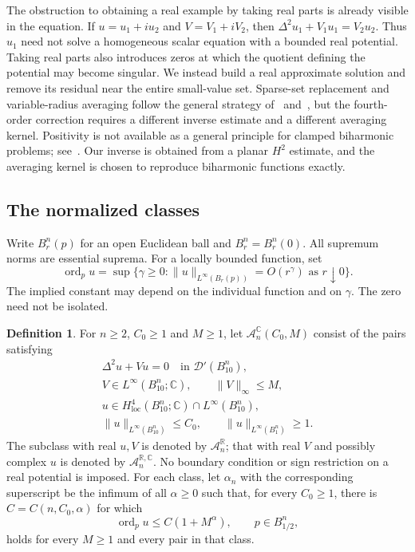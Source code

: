 \documentclass[11pt,twoside,leqno]{article}
\numberwithin{equation}{section}
\theoremstyle{definition}
\newtheorem{definition}[theorem]{Definition}
\theoremstyle{remark}
\newcommand{\R}{\mathbb R}
\newcommand{\C}{\mathbb C}
\newcommand{\ord}{\operatorname{ord}}
\newcommand{\loc}{\mathrm{loc}}
\begin{document}
The obstruction to obtaining a real example by taking real parts is
already visible in the equation. If $u=u_1+iu_2$ and $V=V_1+iV_2$,
then $\Delta^2u_1+V_1u_1=V_2u_2$. Thus $u_1$ need not solve a
homogeneous scalar equation with a bounded real potential. Taking real
parts also introduces zeros at which the quotient defining the potential
may become singular. We instead build a real approximate solution and
remove its residual near the entire small-value set. Sparse-set
replacement and variable-radius averaging follow the general strategy
of~\cite[Sections~6--9]{FI} and~\cite[Section~4]{FGJL}, but the
fourth-order correction requires a different inverse estimate and a
different averaging kernel. Positivity is not available as a general
principle for clamped biharmonic problems; see~\cite{GGS}. Our inverse
is obtained from a planar $H^2$ estimate, and the averaging kernel is
chosen to reproduce biharmonic functions exactly.

\subsection{The normalized classes}

Write $B_r^n(p)$ for an open Euclidean ball and $B_r^n=B_r^n(0)$.
All supremum norms are essential suprema. For a locally bounded function,
set
\begin{equation}\label{eq:order}
 \ord_pu=\sup\{\gamma\ge0:
 \|u\|_{L^\infty(B_r(p))}=O(r^\gamma)\text{ as }r\downarrow0\}.
\end{equation}
The implied constant may depend on the individual function and on
$\gamma$. The zero need not be isolated.

\begin{definition}\label{def:classes}
For $n\ge2$, $C_0\ge1$ and $M\ge1$, let
$\mathcal A_n^{\C}(C_0,M)$ consist of the pairs satisfying
\begin{equation}\label{eq:class}
 \begin{gathered}
 \Delta^2u+Vu=0\quad\text{in }\mathcal D'(B_{10}^n),\\
 V\in L^\infty(B_{10}^n;\C),\qquad \|V\|_\infty\le M,\\
 u\in H^4_{\loc}(B_{10}^n;\C)\cap L^\infty(B_{10}^n),\\
 \|u\|_{L^\infty(B_{10}^n)}\le C_0,\qquad
 \|u\|_{L^\infty(B_1^n)}\ge1.
 \end{gathered}
\end{equation}
The subclass with real $u,V$ is denoted by $\mathcal A_n^{\R}$;
that with real $V$ and possibly complex $u$ is denoted by
$\mathcal A_n^{\R,\C}$. No boundary condition or sign restriction
on a real potential is imposed.
For each class, let $\alpha_n$ with the corresponding superscript
be the infimum of all $\alpha\ge0$ such that, for every $C_0\ge1$,
there is $C=C(n,C_0,\alpha)$ for which
\begin{equation}\label{eq:admissible}
 \ord_pu\le C(1+M^\alpha),\qquad p\in B_{1/2}^n,
\end{equation}
holds for every $M\ge1$ and every pair in that class.
\end{definition}
\end{document}
